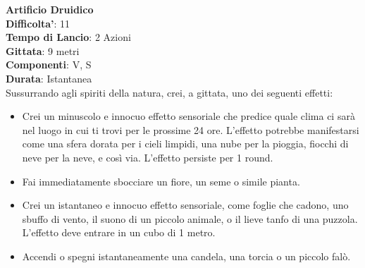 \begin{multicols}{2}
\medskip\textbf{Artificio Druidico}\\
\textbf{Difficolta'}: 11\\
\textbf{Tempo di Lancio}: 2 Azioni\\
\textbf{Gittata}: 9 metri\\
\textbf{Componenti}: V, S\\
\textbf{Durata}: Istantanea\\
Sussurrando agli spiriti della natura, crei, a gittata, uno dei seguenti effetti:
\begin{itemize}
\item
Crei un minuscolo e innocuo effetto sensoriale che predice quale clima ci sarà nel luogo in cui ti trovi per le prossime 24 ore. L’effetto potrebbe manifestarsi come una sfera dorata per i cieli limpidi, una nube per la pioggia, fiocchi di neve per la neve, e così via. L’effetto persiste per 1 round.
\item 
Fai immediatamente sbocciare un fiore, un seme o simile pianta.
\item 
Crei un istantaneo e innocuo effetto sensoriale, come foglie che cadono, uno sbuffo di vento, il suono di un piccolo animale, o il lieve tanfo di una puzzola. L’effetto deve entrare in un cubo di 1 metro.
\item Accendi o spegni istantaneamente una candela, una torcia o un piccolo falò.
\end{itemize}


\end{multicols}
